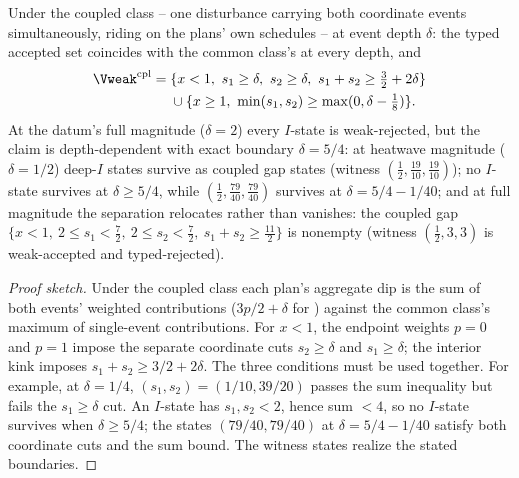 \begin{theorem}\label{thm:coupled}
Under the coupled class -- one disturbance carrying both coordinate events simultaneously, riding on the plans' own schedules -- at event depth $\delta$: the typed accepted set coincides with the common class's at every depth, and
\begin{align*}
\Vweak^{\mathrm{cpl}}={}&\{x<1,\ s_1\ge\delta,\ s_2\ge\delta,\ s_1+s_2\ge\tfrac32+2\delta\}\\
&\cup\{x\ge1,\ \min(s_1,s_2)\ge\max(0,\delta-\tfrac18)\}.
\end{align*}
At the datum's full magnitude ($\delta=2$) every $I$-state is weak-rejected, but the claim is depth-dependent with exact boundary $\delta=5/4$: at heatwave magnitude ($\delta=1/2$) deep-$I$ states survive as coupled gap states (witness $(\tfrac12,\tfrac{19}{10},\tfrac{19}{10})$); no $I$-state survives at $\delta\ge5/4$, while $(\tfrac12,\tfrac{79}{40},\tfrac{79}{40})$ survives at $\delta=5/4-1/40$; and at full magnitude the separation relocates rather than vanishes: the coupled gap $\{x<1,\ 2\le s_1<\tfrac72,\ 2\le s_2<\tfrac72,\ s_1+s_2\ge\tfrac{11}2\}$ is nonempty (witness $(\tfrac12,3,3)$ is weak-accepted and typed-rejected).
\end{theorem}
\begin{proof}[Proof sketch]
Under the coupled class each plan's aggregate dip is the sum of both events' weighted contributions ($3p/2+\delta$ for ) against the common class's maximum of single-event contributions. For $x<1$, the endpoint weights $p=0$ and $p=1$ impose the separate coordinate cuts $s_2\ge\delta$ and $s_1\ge\delta$; the interior kink imposes $s_1+s_2\ge3/2+2\delta$. The three conditions must be used together. For example, at $\delta=1/4$, $(s_1,s_2)=(1/10,39/20)$ passes the sum inequality but fails the $s_1\ge\delta$ cut. An $I$-state has $s_1,s_2<2$, hence sum $<4$, so no $I$-state survives when $\delta\ge5/4$; the states $(79/40,79/40)$ at $\delta=5/4-1/40$ satisfy both coordinate cuts and the sum bound. The witness states realize the stated boundaries.
\end{proof}

